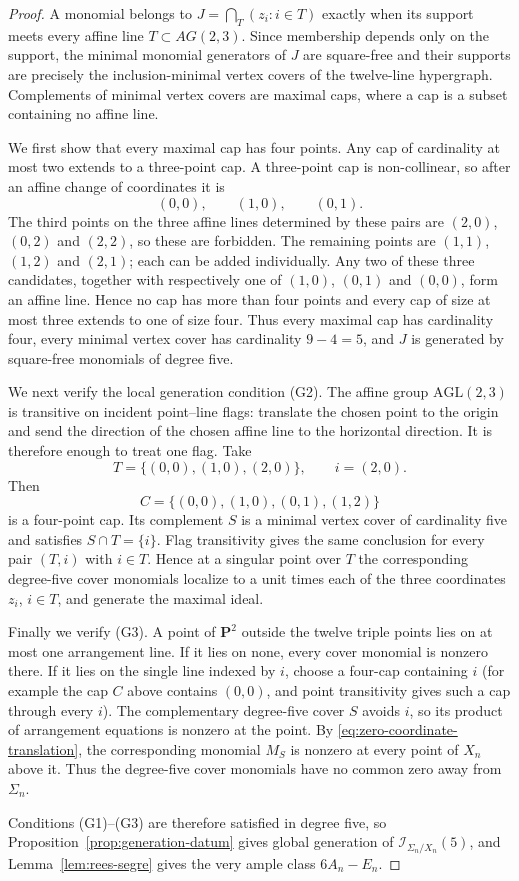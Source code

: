 \documentclass[11pt]{article}
\newcommand{\PP}{\mathbf P}
\newcommand{\cI}{\mathcal I}
\begin{document}
\begin{proof}
A monomial belongs to
$J=\bigcap_T(z_i:i\in T)$ exactly when its support meets every affine line
$T\subset AG(2,3)$.  Since membership depends only on the support, the minimal
monomial generators of $J$ are square-free and their supports are precisely the
inclusion-minimal vertex covers of the twelve-line hypergraph.  Complements of
minimal vertex covers are maximal caps, where a cap is a subset containing no
affine line.

We first show that every maximal cap has four points.  Any cap of cardinality at
most two extends to a three-point cap.  A three-point cap is non-collinear, so
after an affine change of coordinates it is
\[
        (0,0),\qquad (1,0),\qquad (0,1).
\]
The third points on the three affine lines determined by these pairs are
$(2,0)$, $(0,2)$ and $(2,2)$, so these are forbidden.  The remaining points are
$(1,1)$, $(1,2)$ and $(2,1)$; each can be added individually.  Any two of these
three candidates, together with respectively one of $(1,0)$, $(0,1)$ and
$(0,0)$, form an affine line.  Hence no cap has more than four points and every
cap of size at most three extends to one of size four.  Thus every maximal cap
has cardinality four, every minimal vertex cover has cardinality $9-4=5$, and
$J$ is generated by square-free monomials of degree five.

We next verify the local generation condition (G2).  The affine group
$\mathrm{AGL}(2,3)$ is transitive on incident point--line flags: translate the
chosen point to the origin and send the direction of the chosen affine line to
the horizontal direction.  It is therefore enough to treat one flag.  Take
\[
 T=\{(0,0),(1,0),(2,0)\},\qquad i=(2,0).
\]
Then
\[
 C=\{(0,0),(1,0),(0,1),(1,2)\}
\]
is a four-point cap.  Its complement $S$ is a minimal vertex cover of cardinality
five and satisfies $S\cap T=\{i\}$.  Flag transitivity gives the same conclusion
for every pair $(T,i)$ with $i\in T$.  Hence at a singular point over $T$ the
corresponding degree-five cover monomials localize to a unit times each of the
three coordinates $z_i$, $i\in T$, and generate the maximal ideal.

Finally we verify (G3).  A point of $\PP^2$ outside the twelve triple points lies
on at most one arrangement line.  If it lies on none, every cover monomial is
nonzero there.  If it lies on the single line indexed by $i$, choose a four-cap
containing $i$ (for example the cap $C$ above contains $(0,0)$, and point
transitivity gives such a cap through every $i$).  The complementary degree-five
cover $S$ avoids $i$, so its product of arrangement equations is nonzero at the
point.  By \eqref{eq:zero-coordinate-translation}, the corresponding monomial
$M_S$ is nonzero at every point of $X_n$ above it.  Thus the degree-five cover
monomials have no common zero away from $\Sigma_n$.

Conditions (G1)--(G3) are therefore satisfied in degree five, so
Proposition~\ref{prop:generation-datum} gives global generation of
$\cI_{\Sigma_n/X_n}(5)$, and Lemma~\ref{lem:rees-segre} gives the very ample
class $6A_n-E_n$.
\end{proof}
\end{document}
